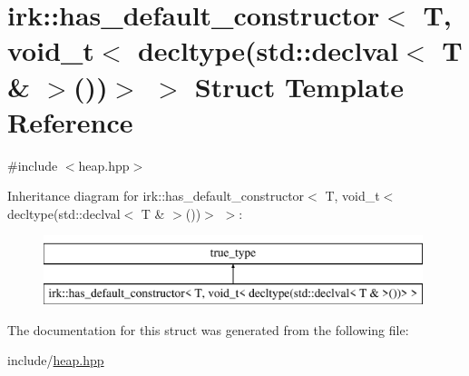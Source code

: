 \hypertarget{structirk_1_1has__default__constructor_3_01T_00_01void__t_3_01decltype_07std_1_1declval_3_01T_01_6_01_4_07_08_08_4_01_4}{}\section{irk\+:\+:has\+\_\+default\+\_\+constructor$<$ T, void\+\_\+t$<$ decltype(std\+:\+:declval$<$ T \& $>$())$>$ $>$ Struct Template Reference}
\label{structirk_1_1has__default__constructor_3_01T_00_01void__t_3_01decltype_07std_1_1declval_3_01T_01_6_01_4_07_08_08_4_01_4}


{\ttfamily \#include $<$heap.\+hpp$>$}

Inheritance diagram for irk\+:\+:has\+\_\+default\+\_\+constructor$<$ T, void\+\_\+t$<$ decltype(std\+:\+:declval$<$ T \& $>$())$>$ $>$\+:\begin{figure}[H]
\begin{center}
\leavevmode
\includegraphics[height=2.000000cm]{structirk_1_1has__default__constructor_3_01T_00_01void__t_3_01decltype_07std_1_1declval_3_01T_01_6_01_4_07_08_08_4_01_4}
\end{center}
\end{figure}


The documentation for this struct was generated from the following file\+:\begin{DoxyCompactItemize}
\item 
include/\mbox{\hyperlink{heap_8hpp}{heap.\+hpp}}\end{DoxyCompactItemize}
